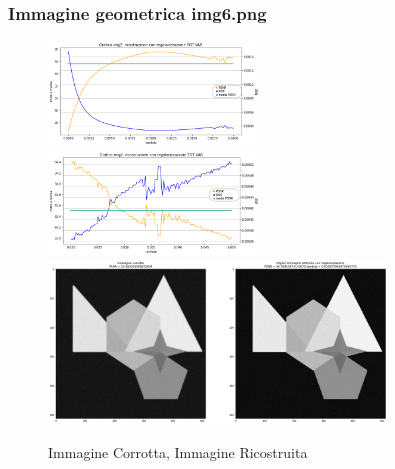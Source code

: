 {\color{rred}\subsubsection{Immagine geometrica img6.png}}
\begin{figure}[H]{}
    \centering
    \includegraphics[width=0.5\textwidth]{IMMAGINI_RELAZIONE/grafico6TOTVAR_riserva.png}%
    \includegraphics[width=0.5\textwidth]{IMMAGINI_RELAZIONE/proseguimentoGraficoTOTVAR6.png}
    \includegraphics[width=0.8\textwidth]{IMMAGINI_RELAZIONE/ricostruzione6TOTVAR.png}
    \caption{Immagine Corrotta, Immagine Ricostruita}
\end{figure}


